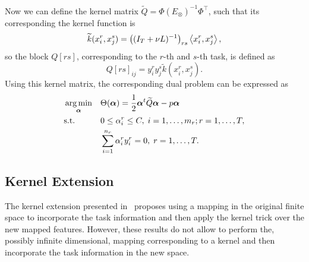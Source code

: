 Now we can define the kernel matrix $\widetilde{Q} = \Phi (E_\otimes)^{-1} \Phi^\intercal$, such that its corresponding the kernel function is
\begin{equation}
    \label{eq:kernelfun_gl}
    \widetilde{k}(x_i^r, x_j^s) =  \left((I_T + \nu L)^{-1}\right)_{rs} \dotp{x_i^r}{x_j^s},
\end{equation}
so the block $Q[{rs}]$, corresponding to the $r$-th and $s$-th task, is defined as
$$ Q[{rs}]_{ij} = y_i^r y_j^s \widetilde{k}(x_i^r, x_j^s) .$$
Using this kernel matrix, the corresponding dual problem can be expressed as
\begin{equation}\label{eq:linear_gl_dual}
    \begin{aligned}
         & \argmin_{\fv{\alpha}}
         &                       & \Theta(\fv{\alpha}) = \frac{1}{2} \fv{\alpha}^t \widetilde{Q} \fv{\alpha} - p \fv{\alpha}                                                             \\
         & \text{s.t.}
         &                       & 0 \leq \alpha_i^r \leq C, \;  i=1,\ldots,m_r; r=1,\ldots,T ,                                                                                          \\
         &                       &                                                                                           & \sum_{i=1}^{n_r}{\alpha_i^r y_i^r} = 0, \; r=1,\ldots,T .
    \end{aligned}
\end{equation}

\subsection{Kernel Extension}

The kernel extension presented in~\cite{EvgeniouMP05} proposes using a mapping in the original finite space to incorporate the task information and then apply the kernel trick over the new mapped features. However, these results do not allow to perform the, possibly infinite dimensional, mapping corresponding to a kernel and then incorporate the task information in the new space.

